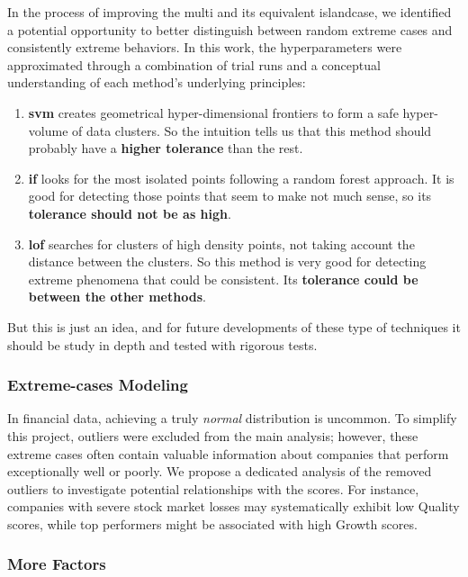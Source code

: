\documentclass[11pt,english,a4paper,hidelinks]{book}
\begin{document}
\noindent In the process of improving the \acrshort{multi} and its equivalent \acrshort{islandcase}, we identified a potential opportunity to better distinguish between random extreme cases and consistently extreme behaviors. In this work, the hyperparameters were approximated through a combination of trial runs and a conceptual understanding of each method’s underlying principles:
\begin{enumerate}
    \item \textbf{\acrshort{svm}} creates geometrical hyper-dimensional frontiers to form a safe hyper-volume of data clusters. So the intuition tells us that this method should probably have a \textbf{higher tolerance} than the rest.
    \item \textbf{\acrshort{if}} looks for the most isolated points following a random forest approach. It is good for detecting those points that seem to make not much sense, so its \textbf{tolerance should not be as high}.
    \item \textbf{\acrshort{lof}} searches for clusters of high density points, not taking account the distance between the clusters. So this method is very good for detecting extreme phenomena that could be consistent. Its \textbf{tolerance could be between the other methods}.
\end{enumerate}

\noindent But this is just an idea, and for future developments of these type of techniques it should be study in depth and tested with rigorous tests.

\subsubsection{Extreme-cases Modeling}

\noindent In financial data, achieving a truly \textit{normal} distribution is uncommon. To simplify this project, outliers were excluded from the main analysis; however, these extreme cases often contain valuable information about companies that perform exceptionally well or poorly. We propose a dedicated analysis of the removed outliers to investigate potential relationships with the scores. For instance, companies with severe stock market losses may systematically exhibit low Quality scores, while top performers might be associated with high Growth scores.

\subsubsection{More Factors}
\end{document}
